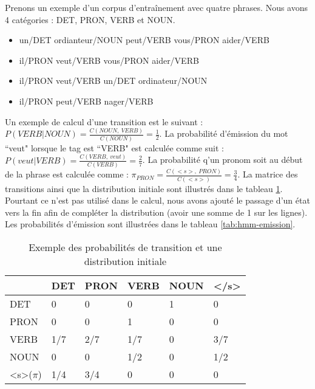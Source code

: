 \documentclass{KodeBook}
\begin{document}
Prenons un exemple d'un corpus d'entraînement avec quatre phrases. 
Nous avons 4 catégories : DET, PRON, VERB et NOUN. 
\begin{itemize}
	\item un/DET ordianteur/NOUN peut/VERB vous/PRON aider/VERB
	\item il/PRON veut/VERB vous/PRON aider/VERB
	\item il/PRON veut/VERB un/DET ordinateur/NOUN
	\item il/PRON peut/VERB nager/VERB
\end{itemize}
Un exemple de calcul d'une transition est le suivant : $P(VERB | NOUN) = \frac{C(NOUN,\ VERB)}{C(NOUN)} = \frac{1}{2}$. 
La probabilité d'émission du mot ``veut" lorsque le tag est ``VERB" est calculée comme suit : $P(veut | VERB) = \frac{C(VERB,\ veut)}{C(VERB)} = \frac{2}{7}$. 
La probabilité q'un pronom soit au début de la phrase est calculée comme : $\pi_{PRON} = \frac{C(<s>,\ PRON)}{C(<s>)} = \frac{3}{4} $.
La matrice des transitions ainsi que la distribution initiale sont illustrés dans le tableau \ref{tab:hmm-trans-init}. 
Pourtant ce n'est pas utilisé dans le calcul, nous avons ajouté le passage d'un état vers la fin afin de compléter la distribution (avoir une somme de 1 sur les lignes). 
Les probabilités d'émission sont illustrées dans le tableau \ref{tab:hmm-emission}. 
\begin{table}[ht]
	\centering
\begin{tabular}{llllll}
	\cline{2-6}\noalign{\vskip\doublerulesep
		\vskip-\arrayrulewidth}\cline{2-6}
	     & DET & PRON & VERB & NOUN & \textless/s\textgreater\\
	\hline
	DET  &  0  &  0   &  0   &   1  &  0  \\
	PRON &  0  &  0   &   1  &  0   &  0  \\
	VERB & 1/7 & 2/7  & 1/7  &  0   & 3/7 \\
	NOUN &  0  &  0   & 1/2  &   0  &  1/2 \\
	\hline
	\textless s\textgreater ($\pi$) &  1/4  &  3/4   & 0  &   0  &  0 \\
	\hline\hline
\end{tabular}
\caption[Exemple des probabilités de transition et une distribution initiale]{Exemple des probabilités de transition et une distribution initiale \label{tab:hmm-trans-init}}
\end{table}
\end{document}
